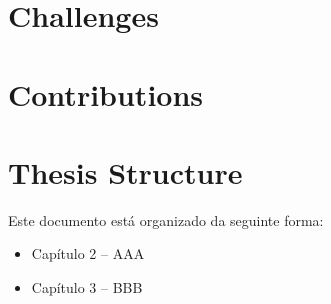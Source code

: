 \section{Challenges}

\section{Contributions}

\section{Thesis Structure}

Este documento está organizado da seguinte forma:
\begin{itemize}
\item Capítulo 2 – AAA
\item Capítulo 3 – BBB
\end{itemize}

